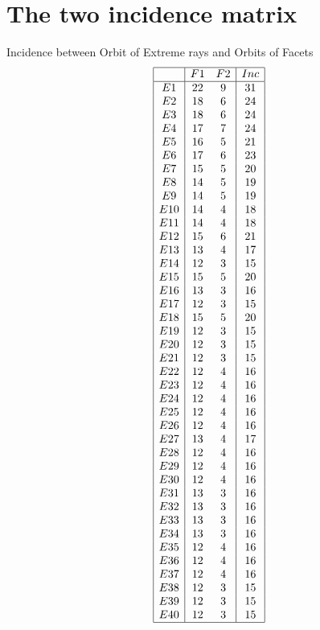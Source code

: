 \documentclass[12pt]{article}
\begin{document}
\section{The two incidence matrix}
Incidence between Orbit of Extreme rays and Orbits of Facets
\begin{equation*}
\begin{array}{|c|cc|c|}
\hline
&F1&F2&Inc\\
\hline
E1&22&9&31\\
E2&18&6&24\\
E3&18&6&24\\
E4&17&7&24\\
E5&16&5&21\\
E6&17&6&23\\
E7&15&5&20\\
E8&14&5&19\\
E9&14&5&19\\
E10&14&4&18\\
E11&14&4&18\\
E12&15&6&21\\
E13&13&4&17\\
E14&12&3&15\\
E15&15&5&20\\
E16&13&3&16\\
E17&12&3&15\\
E18&15&5&20\\
E19&12&3&15\\
E20&12&3&15\\
E21&12&3&15\\
E22&12&4&16\\
E23&12&4&16\\
E24&12&4&16\\
E25&12&4&16\\
E26&12&4&16\\
E27&13&4&17\\
E28&12&4&16\\
E29&12&4&16\\
E30&12&4&16\\
E31&13&3&16\\
E32&13&3&16\\
E33&13&3&16\\
E34&13&3&16\\
E35&12&4&16\\
E36&12&4&16\\
E37&12&4&16\\
E38&12&3&15\\
E39&12&3&15\\
E40&12&3&15\\
\hline
\end{array}
\end{equation*}
\end{document}
